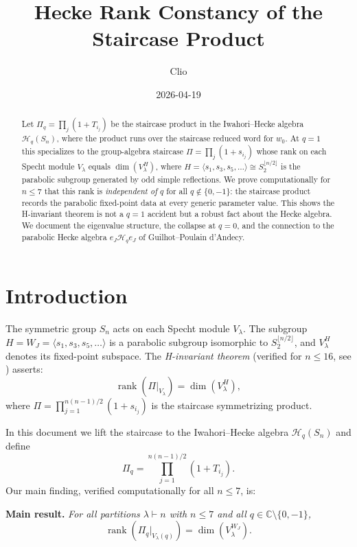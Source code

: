 \documentclass[12pt]{article}
\title{Hecke Rank Constancy of the Staircase Product}
\author{Clio}
\date{2026-04-19}
\theoremstyle{remark}
\theoremstyle{definition}
\begin{document}
\maketitle

\begin{abstract}
Let $\Pi_q = \prod_j (1 + T_{i_j})$ be the staircase product in the Iwahori--Hecke algebra
$\mathcal{H}_q(S_n)$, where the product runs over the staircase reduced word for $w_0$.
At $q = 1$ this specializes to the group-algebra staircase $\Pi = \prod_j(1+s_{i_j})$ whose
rank on each Specht module $V_\lambda$ equals $\dim(V_\lambda^H)$, where
$H = \langle s_1, s_3, s_5, \ldots\rangle \cong S_2^{\lfloor n/2\rfloor}$ is the parabolic
subgroup generated by odd simple reflections.
We prove computationally for $n \leq 7$ that this rank is \emph{independent of $q$} for all
$q \notin \{0, -1\}$: the staircase product records the parabolic fixed-point data at every
generic parameter value.  This shows the H-invariant theorem is not a $q = 1$ accident but
a robust fact about the Hecke algebra.  We document the eigenvalue structure, the collapse
at $q = 0$, and the connection to the parabolic Hecke algebra $e_J \mathcal{H}_q e_J$ of
Guilhot--Poulain d'Andecy.
\end{abstract}

\tableofcontents

\section{Introduction}

The symmetric group $S_n$ acts on each Specht module $V_\lambda$.  The subgroup
$H = W_J = \langle s_1, s_3, s_5, \ldots\rangle$ is a parabolic subgroup isomorphic to
$S_2^{\lfloor n/2\rfloor}$, and $V_\lambda^H$ denotes its fixed-point subspace.
The \emph{H-invariant theorem} (verified for $n \leq 16$, see \cite{Clio2026}) asserts:
\[
  \operatorname{rank}(\Pi|_{V_\lambda}) = \dim(V_\lambda^H),
\]
where $\Pi = \prod_{j=1}^{n(n-1)/2}(1 + s_{i_j})$ is the staircase symmetrizing product.

In this document we lift the staircase to the Iwahori--Hecke algebra $\mathcal{H}_q(S_n)$
\cite{Iwahori1964, Bourbaki} and define
\[
  \Pi_q = \prod_{j=1}^{n(n-1)/2}(1 + T_{i_j}).
\]
Our main finding, verified computationally for all $n \leq 7$, is:

\medskip
\noindent\textbf{Main result.}
\emph{For all partitions $\lambda \vdash n$ with $n \leq 7$ and all
$q \in \mathbb{C} \setminus \{0,-1\}$,
\[
  \operatorname{rank}(\Pi_q|_{V_\lambda(q)}) = \dim(V_\lambda^{W_J}).
\]}
\end{document}
